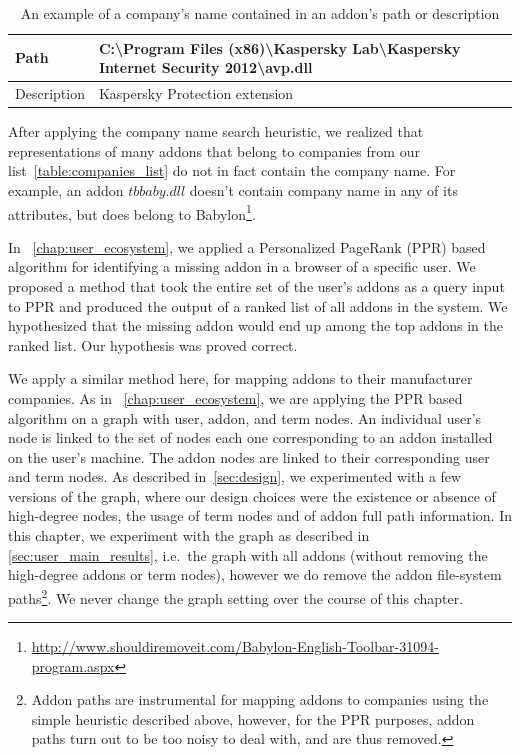 \documentclass[ijoc,nonblindrev]{informs3} %
\numberwithin{equation}{subsection}
\begin{document}
\begin{table}[!htbp]
\small
\centering
\caption{An example of a company's name contained in an addon's path or description}
\label{table:addon_desc}
\begin{tabular}{@{}|l|l|@{}}
\toprule
Path & C:\textbackslash{Program Files (x86)}\textbackslash{Kaspersky Lab}\textbackslash{Kaspersky Internet Security 2012}\textbackslash{avp.dll} \\ \midrule
Description & Kaspersky Protection extension \\ \bottomrule
\end{tabular}
\end{table}

After applying the company name search heuristic, we realized that representations of many addons that belong to companies from our list~\autoref{table:companies_list} do not in fact contain the company name. For example, an addon $tbbaby.dll$ doesn't contain company name in any of its attributes, but does belong to Babylon\footnote{\url{http://www.shouldiremoveit.com/Babylon-English-Toolbar-31094-program.aspx}}.

In ~\autoref{chap:user_ecosystem}, we applied a Personalized PageRank (PPR) based algorithm for identifying a missing addon in a browser of a specific user. We proposed a method that took the entire set of the user's addons as a query input to PPR and produced the output of a ranked list of all addons in the system. We hypothesized that the missing addon would end up among the top addons in the ranked list. Our hypothesis was proved correct.

We apply a similar method here, for mapping addons to their manufacturer companies. 
As in ~\autoref{chap:user_ecosystem}, we are applying the PPR based algorithm on a graph with user, addon, and term nodes. An individual user's node is linked to the set of nodes each one corresponding to an addon installed on the user's machine. The addon nodes are linked to their corresponding user and term nodes. As described in~\autoref{sec:design}, we experimented with a few versions of the graph, where our design choices were the existence or absence of high-degree nodes, the usage of term nodes and of addon full path information. In this chapter, we experiment with the graph as described in \autoref{sec:user_main_results}, i.e.~the graph with all addons (without removing the high-degree addons or term nodes), however we do remove the addon file-system paths\footnote{Addon paths are instrumental for mapping addons to companies using the simple heuristic described above, however, for the PPR purposes, addon paths turn out to be too noisy to deal with, and are thus removed.}. We never change the graph setting over the course of this chapter.
\end{document}
